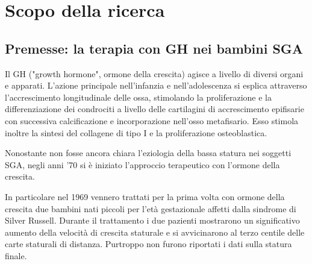  \chapter{Scopo della ricerca}

\section{Premesse: la terapia con GH nei bambini SGA}


Il GH ("growth hormone", ormone della crescita) agisce a livello di diversi organi e apparati.
L'azione principale nell'infanzia e nell'adolescenza si esplica attraverso l'accrescimento
longitudinale delle ossa, stimolando la proliferazione e la differenziazione dei condrociti
a livello delle cartilagini di accrescimento epifisarie con successiva calcificazione
e incorporazione nell'osso metafisario. Esso stimola inoltre la sintesi del collagene 
di tipo I e la proliferazione osteoblastica.\cite{sga}


Nonostante non fosse ancora chiara l'eziologia della bassa statura nei soggetti SGA,
negli anni '70 si è iniziato l'approccio terapeutico con l'ormone della crescita.

In particolare nel 1969 vennero trattati per la prima volta con ormone della crescita  due bambini nati piccoli per l'età gestazionale affetti dalla sindrome di Silver Russell. Durante il trattamento i due pazienti mostrarono un significativo aumento della velocità di crescita staturale e si avvicinarono al terzo centile delle carte staturali di distanza. Purtroppo non furono riportati i dati sulla statura finale\cite{tanner1969low}.

